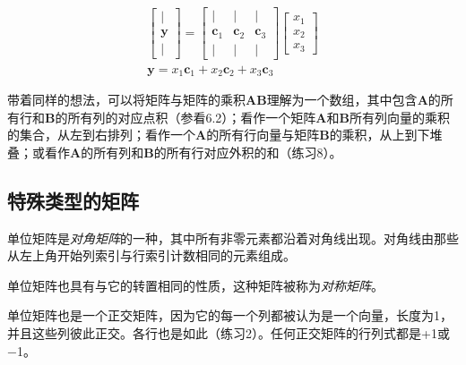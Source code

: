 \documentclass[lang=cn,12pt]{elegantbook}
\begin{document}
$$
  \begin{array}{c}
    {\left[\begin{array}{c}
                 \mid       \\
                 \mathbf{y} \\
                 \mid
               \end{array}\right]=\left[\begin{array}{ccc}
                                          \mid           & \mid           & \mid           \\
                                          \mathbf{c}_{1} & \mathbf{c}_{2} & \mathbf{c}_{3} \\
                                          \mid           & \mid           & \mid
                                        \end{array}\right]\left[\begin{array}{l}
                                                                  x_{1} \\
                                                                  x_{2} \\
                                                                  x_{3}
                                                                \end{array}\right]} \\
    \mathbf{y}=x_{1} \mathbf{c}_{1}+x_{2} \mathbf{c}_{2}+x_{3} \mathbf{c}_{3}
  \end{array}
$$

带着同样的想法，可以将矩阵与矩阵的乘积$\mathbf{AB}$理解为一个数组，其中包含$\mathbf{A}$的所有行和$\mathbf{B}$的所有列的对应点积（参看6.2）；看作一个矩阵$\mathbf{A}$和$\mathbf{B}$所有列向量的乘积的集合，从左到右排列；看作一个$\mathbf{A}$的所有行向量与矩阵$\mathbf{B}$的乘积，从上到下堆叠；或看作$\mathbf{A}$的所有列和$\mathbf{B}$的所有行对应外积的和（练习8）。

\subsection{特殊类型的矩阵}

单位矩阵是\textit{对角矩阵}的一种，其中所有非零元素都沿着对角线出现。对角线由那些从左上角开始列索引与行索引计数相同的元素组成。

单位矩阵也具有与它的转置相同的性质，这种矩阵被称为\textit{对称矩阵}。

单位矩阵也是一个正交矩阵，因为它的每一个列都被认为是一个向量，长度为1，并且这些列彼此正交。各行也是如此（练习2）。任何正交矩阵的行列式都是+1或−1。
\end{document}

